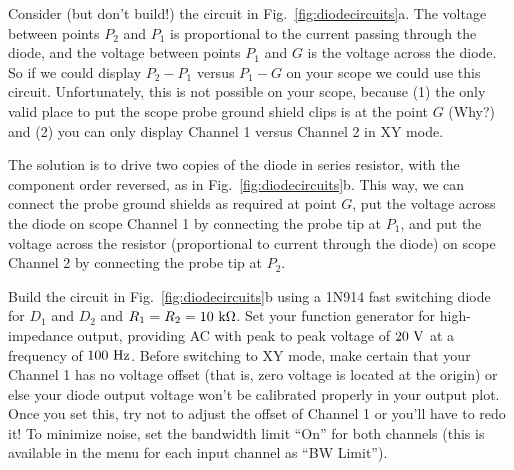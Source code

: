 \documentclass[12pt,oneside]{book}
\begin{document}
Consider (but don't build!) the circuit in Fig.~\ref{fig:diodecircuits}a.  The voltage between points $P_2$ and $P_1$ is proportional to the current passing through the diode, and the voltage between points $P_1$ and $G$ is the voltage across the diode.  So if we could display $P_2-P_1$ versus $P_1-G$ on your scope we could use this circuit.  Unfortunately, this is not possible on your scope, because (1) the only valid place to put the scope probe ground shield clips is at the point $G$ (Why?) and (2) you can only display Channel 1 versus Channel 2 in XY mode.   

The solution is to drive two copies of the diode in series resistor, with the component order reversed, as in Fig.~\ref{fig:diodecircuits}b.  This way, we can connect the probe ground shields as required at point $G$, put the voltage across the diode on scope Channel 1 by connecting the probe tip at $P_1$, and put the voltage across the resistor (proportional to current through the diode) on scope Channel 2 by connecting the probe tip at $P_2$.

Build the circuit in Fig.~\ref{fig:diodecircuits}b using a 1N914 fast switching diode for $D_1$ and $D_2$ and $R_1= R_2 = 10~{\rm k\Omega}$.  Set your function generator for high-impedance output, providing AC with peak to peak voltage of $20~\rm V$ at a frequency of $100~\rm Hz$.  Before switching to XY mode, make certain that your Channel 1 has no voltage offset (that is, zero voltage is located at the origin) or else your diode output voltage won't be calibrated properly in your output plot.   Once you set this, try not to adjust the offset of Channel 1 or you'll have to redo it!  To minimize noise, set the bandwidth limit ``On'' for both channels (this is available in the menu for each input channel as ``BW Limit'').
\end{document}
